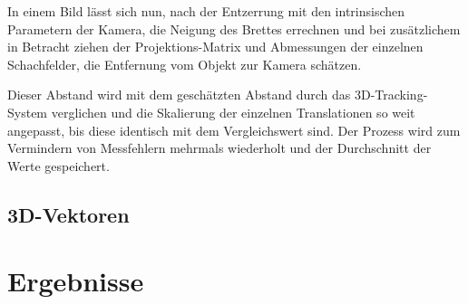 \documentclass[12pt, ngerman]{article}
\begin{document}
In einem Bild lässt sich nun, nach der Entzerrung mit den intrinsischen
Parametern der Kamera, die Neigung des Brettes errechnen und bei zusätzlichem in
Betracht ziehen der Projektions-Matrix und Abmessungen der einzelnen
Schachfelder, die Entfernung vom Objekt zur Kamera schätzen.

Dieser Abstand wird mit dem geschätzten Abstand durch das 3D-Tracking-System
verglichen und die Skalierung der einzelnen Translationen so weit angepasst, bis
diese identisch mit dem Vergleichswert sind. Der Prozess wird zum Vermindern von
Messfehlern mehrmals wiederholt und der Durchschnitt der Werte gespeichert.

\subsection{3D-Vektoren}

\section{Ergebnisse}

\newpage
\nocite{*}
{}
 
\end{document}
